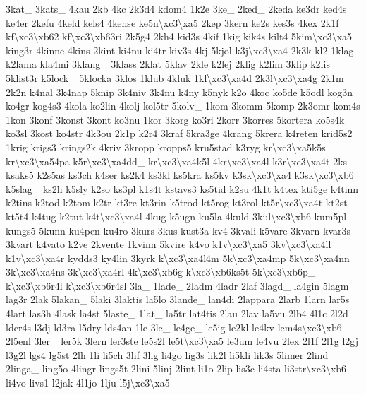 \begin{DoxyCompactItemize}
3kat\-\_\- 3kats\-\_\- 4kau 2kb 4kc 2k3d4 kdom4 1k2e 3ke\-\_\- 2ked\-\_\- 2keda ke3dr ked4s ke4er 2kefu 4keld kels4 4kense ke5n\textbackslash{}xc3\textbackslash{}xa5 2kep 3kern ke2s kes3s 4kex 2k1f kf\textbackslash{}xc3\textbackslash{}xb62 kf\textbackslash{}xc3\textbackslash{}xb63ri 2k5g4 2kh4 kid3s 4kif 1kig kik4s kilt4 5kim\textbackslash{}xc3\textbackslash{}xa5 king3r 4kinne 4kins 2kint ki4nu ki4tr kiv3s 4kj 5kjol k3j\textbackslash{}xc3\textbackslash{}xa4 2k3k kl2 1klag k2lama kla4mi 3klang\-\_\- 3klass 2klat 5klav 2kle k2lej 2klig k2lim 3klip k2lis 5klist3r k5lock\-\_\- 5klocka 3klos 1klub 4kluk 1kl\textbackslash{}xc3\textbackslash{}xa4d 2k3l\textbackslash{}xc3\textbackslash{}xa4g 2k1m 2k2n k4nal 3k4nap 5knip 3k4niv 3k4nu k4ny k5nyk k2o 4koc ko5de k5odl kog3n ko4gr kog4s3 4kola ko2lin 4kolj kol5tr 5kolv\-\_\- 1kom 3komm 5komp 2k3omr kom4s 1kon 3konf 3konst 3kont ko3nu 1kor 3korg ko3ri 2korr 3korres 5kortera ko5s4k ko3sl 3kost ko4str 4k3ou 2k1p k2r4 3kraf 5kra3ge 4krang 5krera k4reten krid5s2 1krig krigs3 krings2k 4kriv 3kropp kropps5 kru5stad k3ryg kr\textbackslash{}xc3\textbackslash{}xa5k5s kr\textbackslash{}xc3\textbackslash{}xa54pa k5r\textbackslash{}xc3\textbackslash{}xa4dd\-\_\- kr\textbackslash{}xc3\textbackslash{}xa4k5l 4kr\textbackslash{}xc3\textbackslash{}xa4l k3r\textbackslash{}xc3\textbackslash{}xa4t 2ks ksaks5 k2s5as ks3ch k4ser ks2k4 ks3kl ks5kra ks5kv k3sk\textbackslash{}xc3\textbackslash{}xa4 k3sk\textbackslash{}xc3\textbackslash{}xb6 k5slag\-\_\- ks2li k5sly k2so ks3pl k1s4t kstavs3 ks5tid k2su 4k1t k4tex kti5ge k4tinn k2tins k2tod k2tom k2tr kt3re kt3rin k5trod kt5rog kt3rol kt5r\textbackslash{}xc3\textbackslash{}xa4t kt2st kt5t4 k4tug k2tut k4t\textbackslash{}xc3\textbackslash{}xa4l 4kug k5ugn ku5la 4kuld 3kul\textbackslash{}xc3\textbackslash{}xb6 kum5pl kungs5 5kunn ku4pen ku4ro 3kurs 3kus kust3a kv4 3kvali k5vare 3kvarn kvar3s 3kvart k4vato k2ve 2kvente 1kvinn 5kvire k4vo k1v\textbackslash{}xc3\textbackslash{}xa5 3kv\textbackslash{}xc3\textbackslash{}xa4ll k1v\textbackslash{}xc3\textbackslash{}xa4r kydds3 ky4lin 3kyrk k\textbackslash{}xc3\textbackslash{}xa4l4m 5k\textbackslash{}xc3\textbackslash{}xa4mp 5k\textbackslash{}xc3\textbackslash{}xa4nn 3k\textbackslash{}xc3\textbackslash{}xa4ns 3k\textbackslash{}xc3\textbackslash{}xa4rl 4k\textbackslash{}xc3\textbackslash{}xb6g k\textbackslash{}xc3\textbackslash{}xb6ks5t 5k\textbackslash{}xc3\textbackslash{}xb6p\-\_\- k\textbackslash{}xc3\textbackslash{}xb6r4l k\textbackslash{}xc3\textbackslash{}xb6r4sl 3la\-\_\- 1lade\-\_\- 2ladm 4ladr 2laf 3lagd\-\_\- la4gin 5lagm lag3r 2lak 5lakan\-\_\- 5laki 3laktis la5lo 3lande\-\_\- lan4di 2lappara 2larb 1larn lar5s 4lart las3h 4lask la4st 5laste\-\_\- 1lat\-\_\- la5tr lat4tis 2lau 2lav la5vu 2lb4 4l1c 2l2d lder4s l3dj ld3ra l5dry lds4an 1le 3le\-\_\- le4ge\-\_\- le5ig le2kl le4kv lem4s\textbackslash{}xc3\textbackslash{}xb6 2l5enl 3ler\-\_\- ler5k 3lern ler3ste le5s2l le5t\textbackslash{}xc3\textbackslash{}xa5 le3um le4vu 2lex 2l1f 2l1g l2gj l3g2l lgs4 lg5st 2lh 1li li5ch 3lif 3lig li4go lig3s lik2l li5kli lik3s 5limer 2lind 2linga\-\_\- ling5o 4lingr lings5t 2lini 5linj 2lint li1o 2lip lis3c li4sta li3str\textbackslash{}xc3\textbackslash{}xb6 li4vo livs1 l2jak 4l1jo 1lju l5j\textbackslash{}xc3\textbackslash{}xa5 
\end{DoxyCompactItemize}
